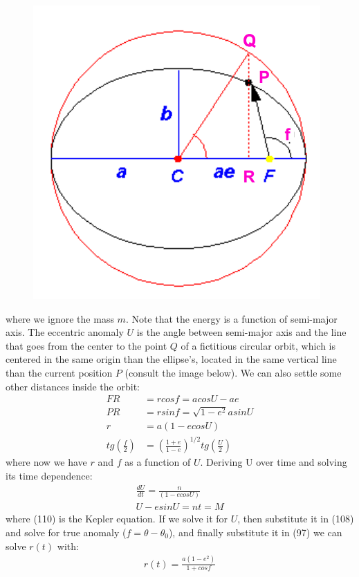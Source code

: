 \documentclass[12pt,a4paper]{article}
\begin{document}
\begin{figure}
\includegraphics[scale=0.5]{7}
\end{figure}
where we ignore the mass $m$. Note that the energy is a function of semi-major axis. The eccentric anomaly $U$ is the angle between semi-major axis and the line that goes from the center to the point $Q$ of a fictitious circular orbit, which is centered in the same origin than the ellipse's, located in the same vertical line than the current position $P$ (consult the image below). We can also settle some other distances inside the orbit:
\begin{align}
    FR&=rcosf=acosU-ae \\
    PR&=rsinf =\sqrt{1-e^2}asinU \\
    r&=a(1-ecosU) \\
    tg(\frac{f}{2})&=(\frac{1+e}{1-e})^{1/2}tg(\frac{U}{2})
\end{align}
where now we have $r$ and $f$ as a function of $U$. Deriving U over time and solving its time dependence:
\begin{align}
    \frac{dU}{dt}=\frac{n}{(1-ecosU)} \\
    U-esinU=nt=M
\end{align}
where (110) is the Kepler equation. If we solve it for $U$, then substitute it in (108) and solve for true anomaly ($f=\theta-\theta_0$), and finally substitute it in (97) we can solve $r(t)$ with:
\begin{align}
    r(t)=\frac{a(1-e^2)}{1+cosf}
\end{align}
\end{document}
